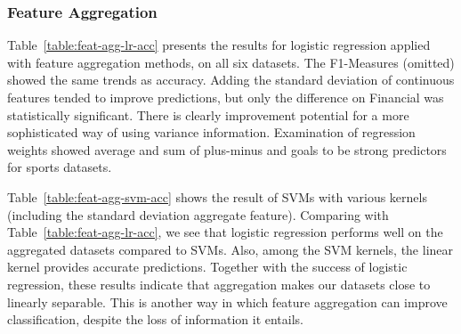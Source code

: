 \documentclass[conference]{IEEEtran}
\begin{document}
\subsubsection{Feature Aggregation}

Table~\ref{table:feat-agg-lr-acc} presents the results for logistic regression applied with feature aggregation methods, on all six datasets. The F1-Measures (omitted) showed the same trends as accuracy. Adding the standard deviation of continuous features tended to improve predictions, but only the difference on Financial was statistically significant. There is clearly improvement potential for a more sophisticated way of using variance information. Examination of regression weights showed average and sum of plus-minus and goals to be strong predictors for sports datasets.

Table~\ref{table:feat-agg-svm-acc} shows the result of SVMs with various kernels (including the standard deviation aggregate feature). Comparing with Table~\ref{table:feat-agg-lr-acc}, we see that logistic regression performs well on the aggregated datasets compared to SVMs. Also, among the SVM kernels, the linear kernel provides accurate predictions. Together with the success of logistic regression, these results indicate that aggregation makes our datasets close to linearly separable. This is another way in which feature aggregation can improve classification, despite the loss of information it entails.


\begin{table}[ht]
\caption{Feature Aggregation Accuracies - Logistic Regression}
\centering
{}
\label{table:feat-agg-lr-acc}
\end{table}
\end{document}
